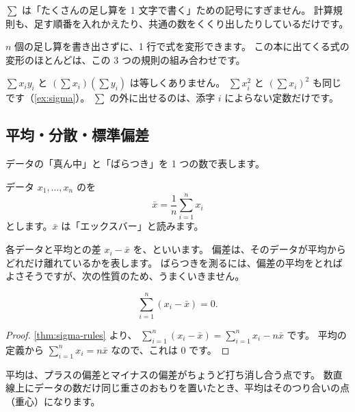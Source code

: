 \begin{intuition}
  $\sum$ は「たくさんの足し算を 1 文字で書く」ための記号にすぎません。
  計算規則も、足す順番を入れかえたり、共通の数をくくり出したりしているだけです。
\end{intuition}

\begin{merit}
  $n$ 個の足し算を書き出さずに、1 行で式を変形できます。
  この本に出てくる式の変形のほとんどは、この 3 つの規則の組み合わせです。
\end{merit}

\begin{exampoint}
  $\sum x_i y_i$ と $\left(\sum x_i\right)\left(\sum y_i\right)$ は等しくありません。
  $\sum x_i^2$ と $\left(\sum x_i\right)^2$ も同じです（\cref{ex:sigma}）。
  $\sum$ の外に出せるのは、添字 $i$ によらない定数だけです。
\end{exampoint}

\subsection{平均・分散・標準偏差}

データの「真ん中」と「ばらつき」を 1 つの数で表します。

\begin{definition}
  データ $x_1, \dots, x_n$ のを
  \[
    \bar{x} = \frac{1}{n} \sum_{i=1}^{n} x_i
  \]
  とします。$\bar{x}$ は「エックスバー」と読みます。
\end{definition}

各データと平均との差 $x_i - \bar{x}$ を、といいます。
偏差は、そのデータが平均からどれだけ離れているかを表します。
ばらつきを測るには、偏差の平均をとればよさそうですが、次の性質のため、うまくいきません。

\begin{proposition}
  \[
    \sum_{i=1}^{n} (x_i - \bar{x}) = 0.
  \]
\end{proposition}

\begin{proof}
  \cref{thm:sigma-rules} より、
  $\sum_{i=1}^{n} (x_i - \bar{x}) = \sum_{i=1}^{n} x_i - n\bar{x}$ です。
  平均の定義から $\sum_{i=1}^{n} x_i = n\bar{x}$ なので、これは $0$ です。
\end{proof}

\begin{intuition}
  平均は、プラスの偏差とマイナスの偏差がちょうど打ち消し合う点です。
  数直線上にデータの数だけ同じ重さのおもりを置いたとき、平均はそのつり合いの点（重心）になります。
\end{intuition}

